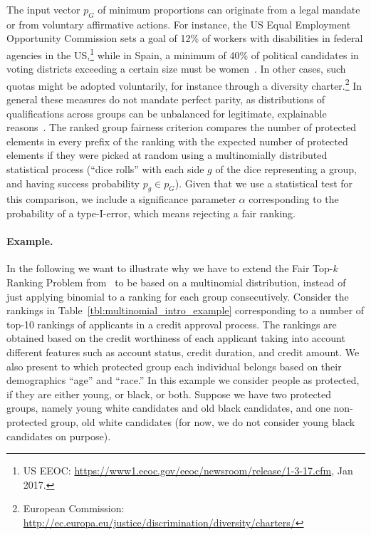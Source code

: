 The input vector $p_G$ of minimum proportions can originate from a legal mandate or from voluntary affirmative actions.
%
For instance, the US Equal Employment Opportunity Commission sets a goal of 12\% of workers with disabilities in federal agencies in the US,\footnote{US EEOC: \url{https://www1.eeoc.gov/eeoc/newsroom/release/1-3-17.cfm}, Jan 2017.}
%
while in Spain, a minimum of 40\% of political candidates in voting districts exceeding a certain size must be women~\cite{verge2010gendering}.
%
In other cases, such quotas might be adopted voluntarily, for instance through a diversity charter.\footnote{European Commission: \url{http://ec.europa.eu/justice/discrimination/diversity/charters/}}
%
In general these measures do not mandate perfect parity, as distributions of qualifications across groups can be unbalanced for legitimate, explainable reasons~\cite{zliobaite2011handling,pedreschi2009integrating}. %
%
The ranked group fairness criterion compares the number of protected elements in every prefix of the ranking with the expected number of protected elements if they were picked at random using a multinomially distributed statistical process (``dice rolls'' with each side $g$ of the dice representing a group, and having success probability $p_g \in p_G$).
%
Given that we use a statistical test for this comparison, we include a significance parameter $\alpha$ corresponding to the probability of a type-I-error, which means rejecting a fair ranking.
%

\paragraph{Example.} In the following we want to illustrate why we have to extend the Fair Top-$k$ Ranking Problem from~\citet{zehlike2017fair} to be based on a multinomial distribution, instead of just applying binomial \algoFAIR to a ranking for each group consecutively. 
%
Consider the rankings in Table~\ref{tbl:multinomial_intro_example} corresponding to a number of top-10 rankings of applicants in a credit approval process. 
%
The rankings are obtained based on the credit worthiness of each applicant taking into account different features such as account status, credit duration, and credit amount.
%
We also present to which protected group each individual belongs based on their demographics ``age'' and ``race.'' 
%
In this example we consider people as protected, if they are either young, or black, or both.
%
Suppose we have two protected groups, namely young white candidates and old black candidates, and one non-protected group, old white candidates (for now, we do not consider young black candidates on purpose).

